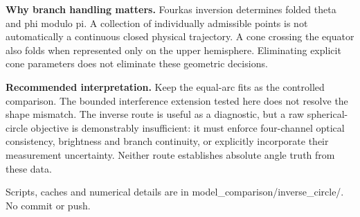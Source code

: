 \documentclass[10pt,a4paper]{article}
\begin{document}
\textbf{Why branch handling matters.} Fourkas inversion determines folded theta and phi modulo pi. A collection of individually admissible points is not automatically a continuous closed physical trajectory. A cone crossing the equator also folds when represented only on the upper hemisphere. Eliminating explicit cone parameters does not eliminate these geometric decisions.

\textbf{Recommended interpretation.} Keep the equal-arc fits as the controlled comparison. The bounded interference extension tested here does not resolve the shape mismatch. The inverse route is useful as a diagnostic, but a raw spherical-circle objective is demonstrably insufficient: it must enforce four-channel optical consistency, brightness and branch continuity, or explicitly incorporate their measurement uncertainty. Neither route establishes absolute angle truth from these data.

Scripts, caches and numerical details are in model\_comparison/inverse\_circle/. No commit or push.
\end{document}
